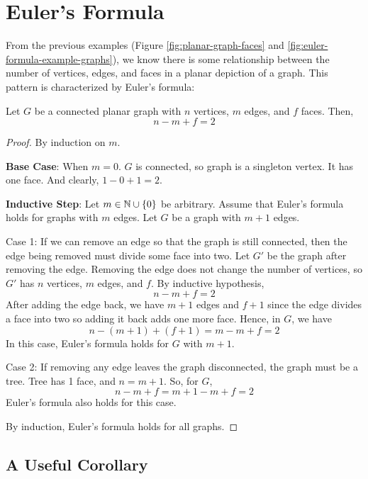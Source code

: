 \section{Euler's Formula}

From the previous examples (Figure \ref{fig:planar-graph-faces} and \ref{fig:euler-formula-example-graphs}), we know there is some relationship between the number of vertices, edges, and faces in a planar depiction of a graph. This pattern is characterized by Euler's formula:

\begin{theorem}
    Let $G$ be a connected planar graph with $n$ vertices, $m$ edges, and $f$ faces. Then,
    $$
    n - m + f = 2
    $$
\end{theorem}

\begin{proof}
    By induction on $m$.

    \textbf{Base Case}: When $m = 0$. $G$ is connected, so graph is a singleton vertex. It has one face. And clearly, $1 - 0 + 1 = 2$.

    \textbf{Inductive Step}: Let $m \in \mathbb{N} \cup \{0\}$ be arbitrary. Assume that Euler's formula holds for graphs with $m$ edges. Let $G$ be a graph with $m+1$ edges.
    
    Case 1: If we can remove an edge so that the graph is still connected, then the edge being removed must divide some face into two. Let $G'$ be the graph after removing the edge. Removing the edge does not change the number of vertices, so $G'$ has $n$ vertices, $m$ edges, and $f$. By inductive hypothesis,
    $$
    n - m + f = 2
    $$
    After adding the edge back, we have $m+1$ edges and $f+1$ since the edge divides a face into two so adding it back adds one more face. Hence, in $G$, we have
    $$
    n - (m+1) + (f+1) = m - m + f = 2
    $$
    In this case, Euler's formula holds for $G$ with $m+1$.

    Case 2: If removing any edge leaves the graph disconnected, the graph must be a tree. Tree has 1 face, and $n = m + 1$. So, for $G$,
    $$
    n - m + f = m + 1 - m + f = 2
    $$
    Euler's formula also holds for this case.

    By induction, Euler's formula holds for all graphs.
\end{proof}

\subsection{A Useful Corollary}

